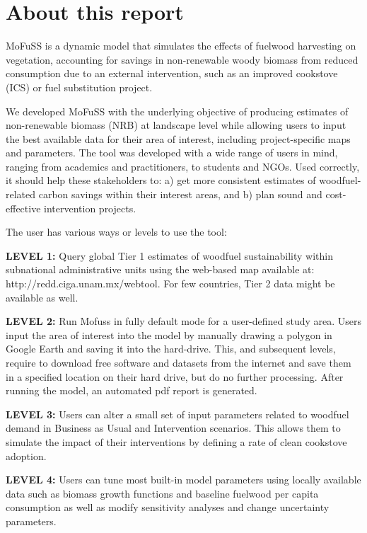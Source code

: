 \documentclass[english,a4paper,11pt,twoside]{report}
\def\chaptername{Chapter}
\begin{document}
 	

\tableofcontents
\renewcommand{\chaptername}{}  %
\newpage
	
\chapter{About this report} \label{ch:Intro}
MoFuSS is a dynamic model that simulates the effects of fuelwood harvesting on vegetation, accounting for savings in non-renewable woody biomass from reduced consumption due to an external intervention, such as an improved cookstove (ICS) or fuel substitution project.

We developed MoFuSS with the underlying objective of producing estimates of non-renewable biomass (NRB) at landscape level while allowing users to input the best available data for their area of interest, including project-specific maps and parameters. The tool was developed with a wide range of users in mind, ranging from academics and practitioners, to students and NGOs. Used correctly, it should help these stakeholders to: a) get more consistent estimates of woodfuel-related carbon savings within their interest areas, and b) plan sound and cost-effective intervention projects.

The user has various ways or levels to use the tool:

\textbf{LEVEL 1:} Query global Tier 1 estimates of woodfuel sustainability within subnational administrative units using the web-based map available at: http://redd.ciga.unam.mx/webtool.  For few countries, Tier 2 data might be available as well.

\textbf{LEVEL 2:} Run Mofuss in fully default mode for a user-defined study area. Users input the area of interest into the model by manually drawing a polygon in Google Earth and saving it into the hard-drive. This, and subsequent levels, require to download free software and datasets from the internet and save them in a specified location on their hard drive, but do no further processing. After running the model, an automated pdf report is generated.

\textbf{LEVEL 3:} Users can alter a small set of input parameters related to woodfuel demand in Business as Usual and Intervention scenarios. This allows them to simulate the impact of their interventions by defining a rate of clean cookstove adoption.

\textbf{LEVEL 4:} Users can tune most built-in model parameters using locally available data such as biomass growth functions and baseline fuelwood per capita consumption as well as modify sensitivity analyses and change uncertainty parameters.
\end{document}
